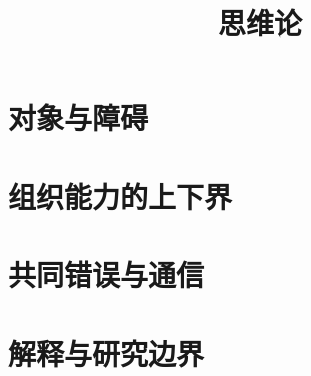 \documentclass[UTF8,11pt,openany,fontset=fandol]{ctexbook}
\title{思维论}
\begin{document}
\frontmatter

\tableofcontents
\listoffigures
\mainmatter
\part{对象与障碍}


\part{组织能力的上下界}



\part{共同错误与通信}



\part{解释与研究边界}


\appendix



\backmatter


\end{document}
